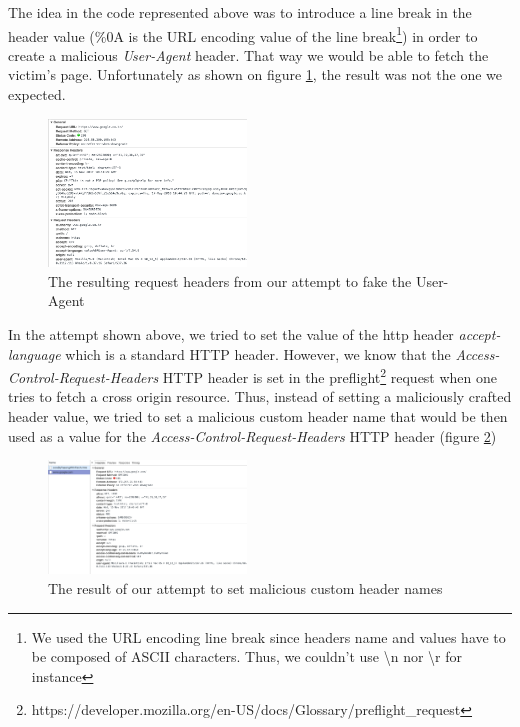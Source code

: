 \documentclass[journal]{IEEEtran}
\begin{document}
The idea in the code represented above was to introduce a line break in the header value (\%0A is the URL encoding value of the line break\footnote{We used the URL encoding line break since headers name and values have to be composed of ASCII characters. Thus, we couldn't use \textbackslash n nor \textbackslash r for instance}) in order to create a malicious \emph{User-Agent} header. That way we would be able to fetch the victim's page. Unfortunately as shown on figure \ref{fig:maliciousHeadersValues}, the result was not the one we expected.

\begin{figure}[h]
\centering
\includegraphics[width=0.47\textwidth]{images/maliciousHeadersValues.png}
\caption{The resulting request headers from our attempt to fake the User-Agent}
\label{fig:maliciousHeadersValues}
\end{figure}

\medskip

In the attempt shown above, we tried to set the value of the http header \emph{accept-language} which is a standard HTTP header. However, we know that the \emph{Access-Control-Request-Headers} HTTP header is set in the preflight\footnote{https://developer.mozilla.org/en-US/docs/Glossary/preflight\_request} request when one tries to fetch a cross origin resource. Thus, instead of setting a maliciously crafted header value, we tried to set a malicious custom header name that would be then used as a value for the \emph{Access-Control-Request-Headers} HTTP header (figure \ref{fig:maliciousHeadersNames})

\begin{figure}[h]
\centering
\includegraphics[width=0.47\textwidth]{images/maliciousHeadersNames.png}
\caption{The result of our attempt to set malicious custom header names}
\label{fig:maliciousHeadersNames}
\end{figure}
\end{document}
